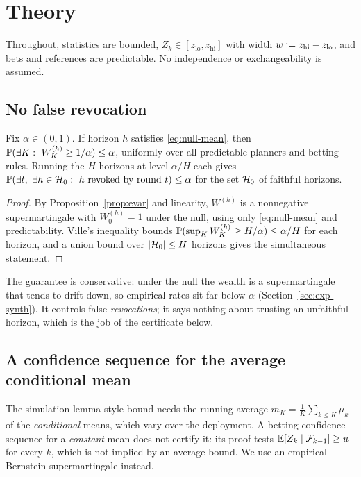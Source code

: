 \section{Theory}\label{sec:theory}

Throughout, statistics are bounded, $Z_k\in[z_{\mathrm{lo}},z_{\mathrm{hi}}]$ with width $w\vcentcolon= z_{\mathrm{hi}}-z_{\mathrm{lo}}$, and bets and references are predictable. No independence or exchangeability is assumed.

\subsection{No false revocation}

\begin{theorem}\label{thm:validity}
Fix $\alpha\in(0,1)$. If horizon $h$ satisfies \eqref{eq:null-mean}, then $\PR(\exists K:\ W^{(h)}_K\ge1/\alpha)\le\alpha$,
uniformly over all predictable planners and betting rules. Running the $H$ horizons at level $\alpha/H$ each gives
$\mathbb{P}(\exists t,\ \exists h\in\mathcal{H}_0:\ h\text{ revoked by round }t)\le\alpha$ for the set $\mathcal{H}_0$ of faithful horizons.
\end{theorem}
\begin{proof}
By Proposition~\ref{prop:evar} and linearity, $W^{(h)}$ is a nonnegative supermartingale with $W^{(h)}_0=1$ under the
null, using only \eqref{eq:null-mean} and predictability. Ville's inequality bounds $\mathbb{P}(\sup_KW^{(h)}_K\ge H/\alpha)\le\alpha/H$ for each horizon, and a union
bound over $|\mathcal{H}_0|\le H$ horizons gives the simultaneous statement.
\end{proof}

The guarantee is conservative: under the null the wealth is a supermartingale that tends to drift down, so empirical rates
sit far below $\alpha$ (Section~\ref{sec:exp-synth}). It controls false \emph{revocations}; it says nothing about trusting an
unfaithful horizon, which is the job of the certificate below.

\subsection{A confidence sequence for the average conditional mean}

The simulation-lemma-style bound needs the running average $m_K=\frac1K\sum_{k\le K}\mu_k$ of the \emph{conditional} means, which vary
over the deployment. A betting confidence sequence for a \emph{constant} mean does not certify it: its proof tests
$\mathbb{E}[Z_k\mid\mathcal{F}_{k-1}]\ge u$ for every $k$, which is not implied by an average bound. We use an
empirical-Bernstein supermartingale instead.

